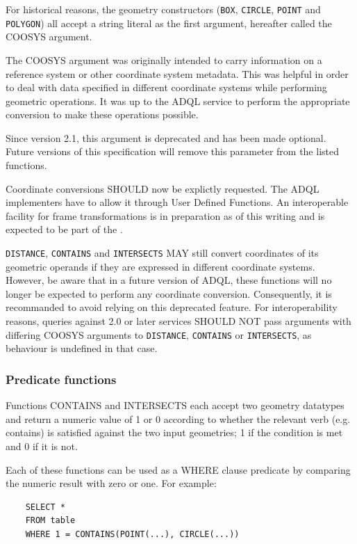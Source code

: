 \documentclass[11pt,a4paper]{ivoa}
\begin{document}
For historical reasons, the geometry constructors (\verb:BOX:, \verb:CIRCLE:,
\verb:POINT: and \verb:POLYGON:) all accept a string literal as the first
argument, hereafter called the COOSYS argument.

The COOSYS argument was originally intended to carry information on
a reference system or other coordinate system metadata. This was helpful in
order to deal with data specified in different coordinate systems while
performing geometric operations. It was up to the ADQL service to perform
the appropriate conversion to make these operations possible.

Since version 2.1, this argument is deprecated and has been made optional.
Future versions of this specification will remove this parameter from the listed
functions.

Coordinate conversions SHOULD now be explictly requested. The ADQL implementers
have to allow it through User Defined Functions. An interoperable facility for
frame transformations is in preparation as of this writing and is expected to be
part of the \CatalogueUDF{}.

\verb:DISTANCE:, \verb:CONTAINS: and \verb:INTERSECTS: MAY still convert
coordinates of its geometric operands if they are expressed in different
coordinate systems. However, be aware that in a future version of ADQL, these
functions will no longer be expected to perform any coordinate conversion.
Consequently, it is recommanded to avoid relying on this deprecated feature.
For interoperability reasons, queries against 2.0 or later services SHOULD NOT
pass arguments with differing COOSYS arguments to \verb:DISTANCE:,
\verb:CONTAINS: or \verb:INTERSECTS:, as behaviour is undefined in that case.

\subsubsection{Predicate functions}
\label{sec:functions.geom.predicate}

Functions CONTAINS and INTERSECTS each accept two geometry datatypes
and return a numeric value of 1 or 0 according to whether the relevant
verb (e.g. contains) is satisfied against the two input geometries;
1 if the condition is met and 0 if it is not.

Each of these functions can be used as a WHERE clause predicate by
comparing the numeric result with zero or one.
For example:
\begin{verbatim}
    SELECT *
    FROM table
    WHERE 1 = CONTAINS(POINT(...), CIRCLE(...))
\end{verbatim}
\end{document}
